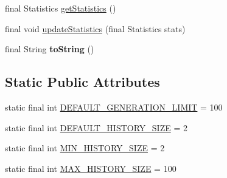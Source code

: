 \begin{CompactItemize}
\item 
final Statistics \hyperlink{classjenes_1_1_genetic_algorithm_3_01_t_01extends_01_chromosome_01_4_484fcdba7cf2e4aa4a6ec1c0006e2193}{getStatistics} ()
\item 
final void \hyperlink{classjenes_1_1_genetic_algorithm_3_01_t_01extends_01_chromosome_01_4_8a4f4965c968047c55a8b56240267a4f}{updateStatistics} (final Statistics stats)
\item 
\hypertarget{classjenes_1_1_genetic_algorithm_3_01_t_01extends_01_chromosome_01_4_f847a2a8cba2288fbddf726ec12eaf47}{
final String \textbf{toString} ()}
\label{classjenes_1_1_genetic_algorithm_3_01_t_01extends_01_chromosome_01_4_f847a2a8cba2288fbddf726ec12eaf47}

\end{CompactItemize}
\subsection*{Static Public Attributes}
\begin{CompactItemize}
\item 
static final int \hyperlink{classjenes_1_1_genetic_algorithm_3_01_t_01extends_01_chromosome_01_4_2492ee1b00f5631a1c1b1c6f15ea3421}{DEFAULT\_\-GENERATION\_\-LIMIT} = 100
\item 
static final int \hyperlink{classjenes_1_1_genetic_algorithm_3_01_t_01extends_01_chromosome_01_4_23df2e338c3439d7457ff6a150c573e1}{DEFAULT\_\-HISTORY\_\-SIZE} = 2
\item 
static final int \hyperlink{classjenes_1_1_genetic_algorithm_3_01_t_01extends_01_chromosome_01_4_a64b297086826bfbda1fbaccebe4cb24}{MIN\_\-HISTORY\_\-SIZE} = 2
\item 
static final int \hyperlink{classjenes_1_1_genetic_algorithm_3_01_t_01extends_01_chromosome_01_4_cd26085cf69c68d607ef08d0bf829224}{MAX\_\-HISTORY\_\-SIZE} = 100
\end{CompactItemize}
